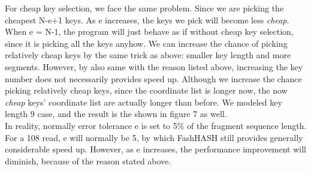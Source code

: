 For cheap key selection, we face the same problem.  Since we are picking the
cheapest N-e+1 keys. As e increases, the keys we pick will become less
\textit{cheap}. When e = N-1, the program will just behave as if without cheap
key selection, since it is picking all the keys anyhow. We can increase the
chance of picking relatively cheap keys by the same trick as above: smaller key
length and more segments. However, by also same with the reason listed above,
increasing the key number does not necessarily provides speed up. Although we
increase the chance picking relatively cheap keys, since the coordinate list is
longer now, the now \textit{cheap} keys’ coordinate list are actually longer
than before. We modeled key length 9 case, and the result is the shown in
figure 7 as well. \\ 

In reality, normally error tolerance e is set to 5\% of the fragment sequence
length. For a 108 read, e will normally be 5, by which FashHASH still provides
generally considerable speed up. However, as e increases, the performance
improvement will diminish, because of the reason stated above. \\
